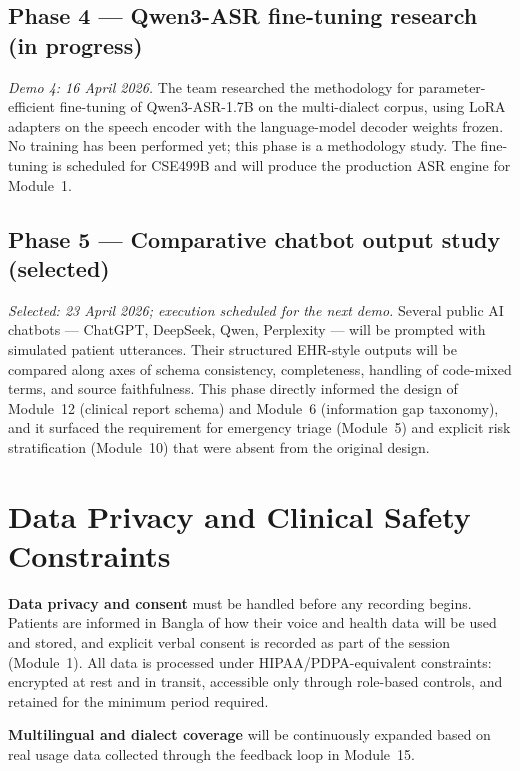 \documentclass[12pt,a4paper]{article}
\begin{document}
\subsection*{Phase 4 --- Qwen3-ASR fine-tuning research (in progress)}
\textit{Demo 4: 16 April 2026.}
The team researched the methodology for parameter-efficient fine-tuning
of Qwen3-ASR-1.7B on the multi-dialect corpus, using LoRA adapters on
the speech encoder with the language-model decoder weights frozen. No
training has been performed yet; this phase is a methodology study. The
fine-tuning is scheduled for CSE499B and will produce the production
ASR engine for Module~1.

\subsection*{Phase 5 --- Comparative chatbot output study (selected)}
\textit{Selected: 23 April 2026; execution scheduled for the next demo.}
Several public AI chatbots --- ChatGPT, DeepSeek, Qwen, Perplexity ---
will be prompted with simulated patient utterances. Their structured
EHR-style outputs will be compared along axes of schema consistency,
completeness, handling of code-mixed terms, and source faithfulness.
This phase directly informed the design of Module~12 (clinical report
schema) and Module~6 (information gap taxonomy), and it surfaced the
requirement for emergency triage (Module~5) and explicit risk
stratification (Module~10) that were absent from the original design.

\section{Data Privacy and Clinical Safety Constraints}

\textbf{Data privacy and consent} must be handled before any recording
begins. Patients are informed in Bangla of how their voice and health
data will be used and stored, and explicit verbal consent is recorded as
part of the session (Module~1). All data is processed under
HIPAA/PDPA-equivalent constraints: encrypted at rest and in transit,
accessible only through role-based controls, and retained for the
minimum period required.

\textbf{Multilingual and dialect coverage} will be continuously expanded
based on real usage data collected through the feedback loop in
Module~15.
\end{document}

